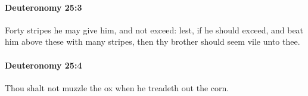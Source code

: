 		\paragraph{Deuteronomy 25:3} %
			\label{DEUTERONOMY-25-3}

			Forty stripes he may give him, and not exceed: lest, if he should exceed, and beat him above these with many stripes, then thy brother should seem vile unto thee.


		\paragraph{Deuteronomy 25:4} %
			\label{DEUTERONOMY-25-4}

			Thou shalt not muzzle the ox when he treadeth out the corn.


